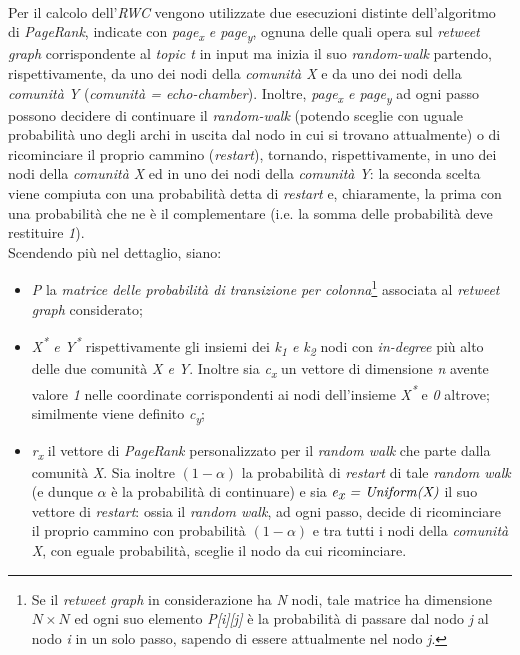\begin{enumerate}
\\Per il calcolo dell'\textit{RWC} vengono utilizzate due esecuzioni distinte dell'algoritmo di \textit{PageRank}, indicate con \textit{page\textsubscript{x} e page\textsubscript{y}}, ognuna delle quali opera sul \textit{retweet graph} corrispondente al \textit{topic t} in input ma inizia il suo \textit{random-walk} partendo, rispettivamente, da uno dei nodi della \textit{comunità X} e da uno dei nodi della \textit{comunità Y} (\textit{comunità = echo-chamber}). Inoltre, \textit{page\textsubscript{x} e page\textsubscript{y}} ad ogni passo possono decidere di continuare il \textit{random-walk} (potendo sceglie con uguale probabilità uno degli archi in uscita dal nodo in cui si trovano attualmente) o di ricominciare il proprio cammino (\textit{restart}), tornando, rispettivamente, in uno dei nodi della \textit{comunità X} ed in uno dei nodi della \textit{comunità Y}: la seconda scelta viene compiuta con una probabilità detta di \textit{restart} e, chiaramente, la prima con una probabilità che ne è il complementare (i.e. la somma delle probabilità deve restituire \textit{1}).
\\Scendendo più nel dettaglio, siano:
\begin{itemize}
\item \textit{P} la \textit{matrice delle probabilità di transizione per colonna}\footnote{Se il \textit{retweet graph} in considerazione ha \textit{N} nodi, tale matrice ha dimensione $N \times N$ ed ogni suo elemento \textit{P[i][j]} è la probabilità di passare dal nodo \textit{j} al nodo \textit{i} in un solo passo, sapendo di essere attualmente nel nodo \textit{j}.} associata al \textit{retweet graph} considerato;
\item \textit{X\textsuperscript{*} e Y\textsuperscript{*}} rispettivamente gli insiemi dei \textit{k\textsubscript{1} e k\textsubscript{2}} nodi con \textit{in-degree} più alto delle due comunità \textit{X e Y}. Inoltre sia \textit{c\textsubscript{x}} un vettore di dimensione \textit{n} avente valore \textit{1} nelle coordinate corrispondenti ai nodi dell'insieme \textit{X\textsuperscript{*}} e \textit{0} altrove; similmente viene definito \textit{c\textsubscript{y}};
\item \textit{r\textsubscript{x}} il vettore di \textit{PageRank} personalizzato per il \textit{random walk} che parte dalla comunità \textit{X}. Sia inoltre $(1-\alpha)$ la probabilità di \textit{restart} di tale \textit{random walk} (e dunque $\alpha$ è la probabilità di continuare) e sia $\textit{e\textsubscript{x} = Uniform(X)}$ il suo vettore di \textit{restart}: ossia il \textit{random walk}, ad ogni passo, decide di ricominciare il proprio cammino con probabilità $(1-\alpha)$ e tra tutti i nodi della \textit{comunità X}, con eguale probabilità, sceglie il nodo da cui ricominciare.

\end{itemize}
\end{enumerate}
